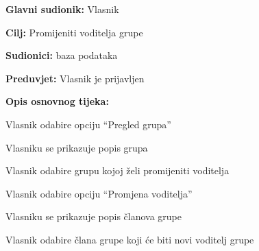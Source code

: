 			\noindent {}
			\begin{packed_item}
				\item \textbf{Glavni sudionik: } Vlasnik
				\item  \textbf{Cilj:} Promijeniti voditelja grupe
				\item  \textbf{Sudionici:} baza podataka
				\item  \textbf{Preduvjet:} Vlasnik je prijavljen
				\item  \textbf{Opis osnovnog tijeka:}
				\item[] \begin{packed_enum}
					\item Vlasnik odabire opciju “Pregled grupa”
					\item Vlasniku se prikazuje popis grupa
					\item Vlasnik odabire grupu kojoj želi promijeniti voditelja	
					\item Vlasnik odabire opciju “Promjena voditelja”
					\item Vlasniku se prikazuje popis članova grupe
					\item Vlasnik odabire člana grupe koji će biti novi voditelj grupe
				\end{packed_enum}
			\end{packed_item}
			\noindent {}
